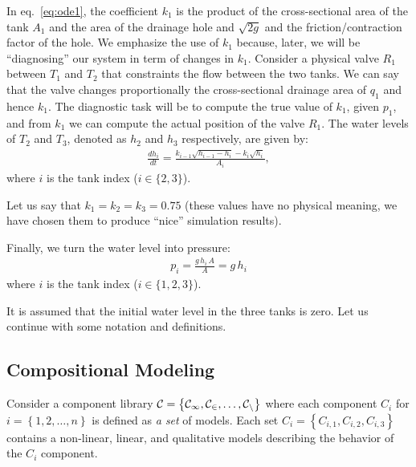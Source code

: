 %
In eq.~\ref{eq:ode1}, the coefficient $k_1$ is the product of the
cross-sectional area of the tank $A_1$ and the area of the drainage
hole and $\sqrt{2g}$ and the friction/contraction factor of the
hole. We emphasize the use of $k_1$ because, later, we will be
``diagnosing'' our system in term of changes in $k_1$. Consider a
physical valve $R_1$ between $T_1$ and $T_2$ that constraints the flow
between the two tanks. We can say that the valve changes
proportionally the cross-sectional drainage area of $q_1$ and hence
$k_1$. The diagnostic task will be to compute the true value of $k_1$,
given $p_1$, and from $k_1$ we can compute the actual position of the
valve $R_1$.
%
The water levels of $T_2$ and $T_3$, denoted as $h_2$ and $h_3$
respectively, are given by:
%
\begin{eqnarray}\label{eq:tank1}
%
\frac{d h_i}{dt} = \frac{k_{i - 1} \sqrt{h_{i - 1} - h_i} - k_i \sqrt{h_i}}{A_i},
%
\end{eqnarray}
%
where $i$ is the tank index ($i \in \{2, 3\}$).
\par
Let us say that $k_1 = k_2 = k_3 = 0.75$ (these values have no
physical meaning, we have chosen them to produce ``nice'' simulation
results).
\par
Finally, we turn the water level into pressure:
\begin{eqnarray}
p_i = \frac{g\,h_i\,A}{A} = g\,h_i\label{eq:pressure}
\end{eqnarray}
where $i$ is the tank index ($i \in \{1, 2, 3\}$).
\par
It is assumed that the initial water level in the three tanks is zero.
%
Let us continue with some notation and definitions.
%
\subsection{Compositional Modeling}
%
Consider a component library $\cal{C} = \left\{C_1, C_2, \ldots,
C_n\right\}$ where each component $C_i$ for $i = \left\{1, 2, \ldots,
n\right\}$ is defined as \textit{a set} of models. Each set $C_i =
\left\{C_{i, 1}, C_{i, 2}, C_{i, 3}\right\}$ contains a non-linear,
linear, and qualitative models describing the behavior of the $C_i$
component.


